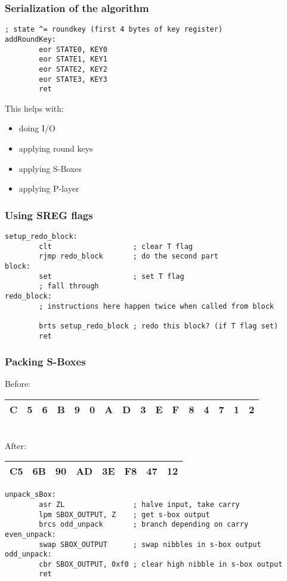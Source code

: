 \documentclass{beamer}
\begin{document}
\begin{frame}[fragile]
\frametitle{Serialization of the algorithm}
\begin{lstlisting}
; state ^= roundkey (first 4 bytes of key register)
addRoundKey:
        eor STATE0, KEY0
        eor STATE1, KEY1
        eor STATE2, KEY2
        eor STATE3, KEY3
        ret
\end{lstlisting}

This helps with:
\begin{itemize}
        \item doing I/O
        \item applying round keys
        \item applying S-Boxes
        \item applying P-layer
\end{itemize}

\end{frame}

\begin{frame}[fragile]
\frametitle{Using SREG flags}
\begin{lstlisting}
setup_redo_block:
        clt                   ; clear T flag
        rjmp redo_block       ; do the second part
block:
        set                   ; set T flag
        ; fall through
redo_block:
        ; instructions here happen twice when called from block

        brts setup_redo_block ; redo this block? (if T flag set)
        ret
\end{lstlisting}
\end{frame}

\begin{frame}[fragile]
\frametitle{Packing S-Boxes}
	\footnotesize{
	Before: \\
	\begin{tabular}{ | c | c | c | c | c | c | c | c | c | c | c | c | c | c | c | c | }
	  \hline                        
	  C & 5 & 6 & B & 9 & 0 & A & D & 3 & E & F & 8 & 4 & 7 & 1 & 2 \\
	  \hline  
	\end{tabular}
	\\

	After: \\
	\begin{tabular}{ | c | c | c | c | c | c | c | c | }
	  \hline                        
	  C5 & 6B & 90 & AD & 3E & F8 & 47 & 12 \\
	  \hline  
	\end{tabular}
	}

\begin{lstlisting}
unpack_sBox:
        asr ZL                ; halve input, take carry
        lpm SBOX_OUTPUT, Z    ; get s-box output
        brcs odd_unpack       ; branch depending on carry
even_unpack:
        swap SBOX_OUTPUT      ; swap nibbles in s-box output
odd_unpack:
        cbr SBOX_OUTPUT, 0xf0 ; clear high nibble in s-box output
        ret
\end{lstlisting}
\end{frame}
\end{document}
